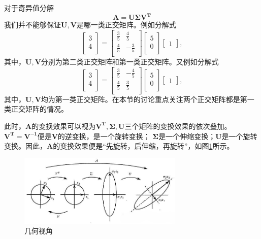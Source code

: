 \documentclass[12pt, a4paper, oneside]{ctexart}
\theoremstyle{remark}
\theoremstyle{definition}
\theoremstyle{definition}
\theoremstyle{plain}
\begin{document}
对于奇异值分解
\[\bm{A}=\bm{U\Sigma V^T}\]
我们并不能够保证$\bm{U},\bm{V}$是哪一类正交矩阵。例如分解式
\[\begin{bmatrix}
    3\\
    4\\
\end{bmatrix}=\begin{bmatrix}
    \frac{3}{5}&\frac{4}{5}\\
    \frac{4}{5}&-\frac{3}{5}\\
\end{bmatrix}\begin{bmatrix}
    5\\0\\
\end{bmatrix}\begin{bmatrix}
    1
\end{bmatrix},\]
其中，$\bm{U},\bm{V}$分别为第二类正交矩阵和第一类正交矩阵。又例如分解式
\[\begin{bmatrix}
    3\\
    4\\
\end{bmatrix}=\begin{bmatrix}
    \frac{3}{5}&-\frac{4}{5}\\
    \frac{4}{5}&\frac{3}{5}\\
\end{bmatrix}\begin{bmatrix}
    5\\0\\
\end{bmatrix}\begin{bmatrix}
    1
\end{bmatrix},\]
其中，$\bm{U},\bm{V}$均为第一类正交矩阵。在本节的讨论重点关注两个正交矩阵都是第一类正交矩阵的情况。

此时，$\bm{A}$的变换效果可以视为$\bm{V^T},\bm{\Sigma},\bm{U}$三个矩阵的变换效果的依次叠加。$\bm{V^T}=\bm{V^{-1}}$便是$\bm{V}$的逆变换，是一个旋转变换；
$\bm{\Sigma}$是一个伸缩变换；$\bm{U}$是一个旋转变换。因此，$\bm{A}$的变换效果便是“先旋转，后伸缩，再旋转”，如图\ref*{geo}所示。
\begin{figure}[h]
    \centering
    \includegraphics*[width = 0.7\textwidth]{geopre.jpg}
    \caption{几何视角}\label{geo}
\end{figure}
\end{document}
